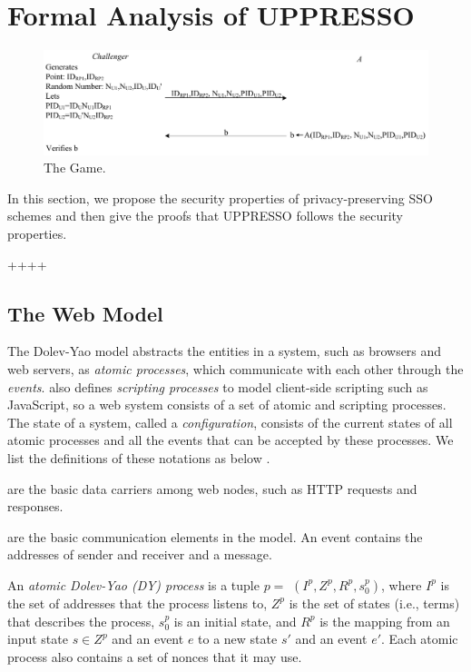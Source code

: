 \section{Formal Analysis of UPPRESSO}
\label{sec:analysis}
\begin{figure}
  \centering
  \includegraphics[width=0.82\linewidth]{fig/game1.pdf}
  \vspace{-6mm}
  \caption{The Game.}
  \label{fig:game}
\vspace{-7mm}
\end{figure}
In this section, we propose the security properties of privacy-preserving SSO schemes and then give the proofs that UPPRESSO follows the security properties.

++++


\subsection{The Web Model}
\label{subsec:webmodel}
The Dolev-Yao model abstracts the entities in a system, such as browsers and web servers, as {\em atomic processes}, which communicate with each other through the {\em events}. \cite{SPRESSO} also defines {\em scripting processes} to model client-side scripting such as JavaScript, so a web system consists of a set of atomic and scripting processes. The state of a system, called a {\em configuration}, consists of the current states of all atomic processes and all the events that can be accepted by these processes. We list the definitions of these notations as below \cite{SPRESSO}.

  are the basic data carriers among web nodes, such as HTTP requests and responses.

 are the basic communication elements in the model. An event contains the addresses of sender and receiver and a message.

 An {\em atomic Dolev-Yao (DY) process} is a tuple $p=$ $(I^p, Z^p, R^p,s_0^p )$, where $I^p$ is the set of addresses that the process listens to, $Z^p$ is the set of states (i.e., terms) that describes the process, $s_0^p$ is an initial state, and $R^p$ is the mapping from an input state $s \in Z^p$ and an event $e$ to a new state $s'$ and an event $e'$. %
Each atomic process also contains a set of nonces that it may use.

